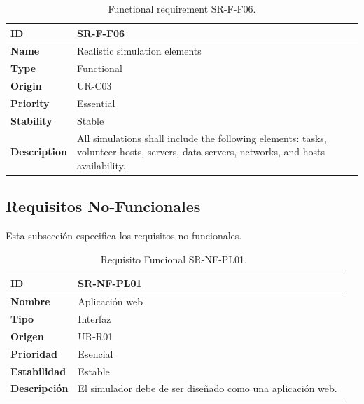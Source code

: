 \begin{center}
\begin{table}[htbp]
\centering
\begin{tabular}{@{}p{2.5cm} p{9cm}@{}} 
\toprule
\textbf{ID} 				& SR-F-F06\\
\midrule
\textbf{Name} 			& Realistic simulation elements \\
\midrule
\textbf{Type} 			& Functional \\
\midrule
\textbf{Origin} 			& UR-C03 \\
\midrule
\textbf{Priority}		& Essential \\
\midrule
\textbf{Stability} 		& Stable \\
\midrule
\textbf{Description} 	& All simulations shall include the following elements: tasks, volunteer hosts, servers, data servers, networks, and hosts availability. \\
\bottomrule
\end{tabular}
\caption{Functional requirement SR-F-F06.}
\label{tab:srff06}
\end{table}
\end{center}

\fi

\subsection{Requisitos No-Funcionales}

Esta subsección especifica los requisitos no-funcionales.

\begin{center}
\begin{table}[htbp]
\centering
\begin{tabular}{@{}p{2.5cm} p{9cm}@{}} 
\toprule
\textbf{ID} 				& SR-NF-PL01 \\
\midrule
\textbf{Nombre} 			& Aplicación web \\
\midrule
\textbf{Tipo} 			& Interfaz \\
\midrule
\textbf{Origen} 			& UR-R01 \\
\midrule
\textbf{Prioridad}		& Esencial \\
\midrule
\textbf{Estabilidad} 		& Estable \\
\midrule
\textbf{Descripción} 	& El simulador debe de ser diseñado como una aplicación web. \\
\bottomrule
\end{tabular}
\caption{Requisito Funcional SR-NF-PL01.}
\label{tab:srnfpl01}
\end{table}
\end{center}

